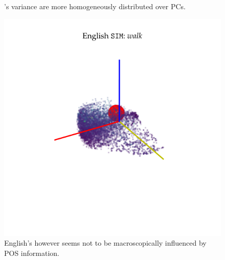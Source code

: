 \begin{figure}
\begin{minipage}[t]{.5\textwidth}
        \centering
        \caption[French  Space Visualization]{'s variance are more homogeneously distributed over PCs.}
        \label{fig:freASNmarcher}
    \end{minipage}
\end{figure}


\begin{figure}
    \centering
    \includegraphics[scale=1]{Figures/EngSIMPCAforwalk.pdf}
    \caption[English  Space Visualization]{English's  however seems not to be macroscopically influenced by POS information.}
    \label{fig:engSIMwalk}
\end{figure}

